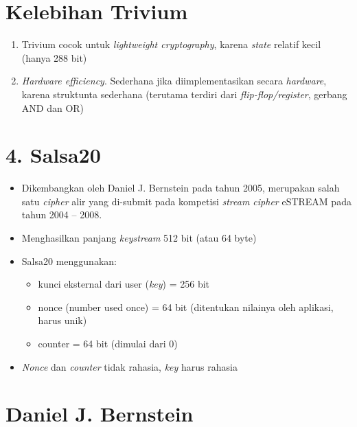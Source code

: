 \documentclass{article}
\begin{document}

\section*{Kelebihan Trivium}

\begin{enumerate}
    \item Trivium cocok untuk \textit{lightweight cryptography}, karena \textit{state} relatif kecil (hanya 288 bit)
    \item \textit{Hardware efficiency}. Sederhana jika diimplementasikan secara \textit{hardware}, karena struktunta sederhana (terutama terdiri dari \textit{flip-flop/register}, gerbang AND dan OR)
\end{enumerate}

\newpage


\section*{4. Salsa20}

\begin{itemize}
    \item Dikembangkan oleh Daniel J. Bernstein pada tahun 2005, merupakan salah satu \textit{cipher} alir yang di-submit pada kompetisi \textit{stream cipher} eSTREAM pada tahun 2004 -- 2008.
    \item Menghasilkan panjang \textit{keystream} 512 bit (atau 64 byte)
    \item Salsa20 menggunakan:
    \begin{itemize}
        \item kunci eksternal dari user (\textit{key}) = 256 bit
        \item nonce (number used once) = 64 bit (ditentukan nilainya oleh aplikasi, harus unik)
        \item counter = 64 bit (dimulai dari 0)
    \end{itemize}
    \item \textit{Nonce} dan \textit{counter} tidak rahasia, \textit{key} harus rahasia
\end{itemize}

\newpage


\section*{Daniel J. Bernstein}
\end{document}

